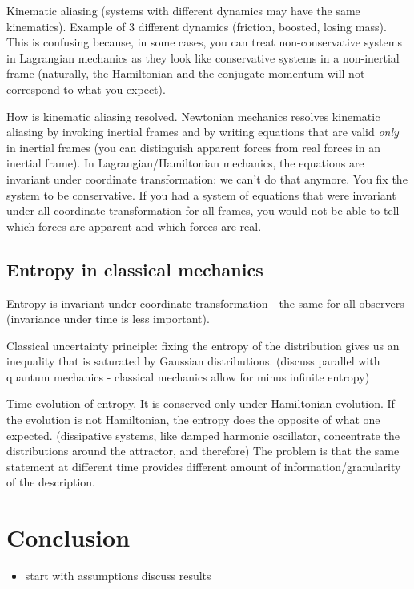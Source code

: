 \documentclass{article}
\begin{document}
Kinematic aliasing (systems with different dynamics may have the same kinematics). Example of 3 different dynamics (friction, boosted, losing mass). This is confusing because, in some cases, you can treat non-conservative systems in Lagrangian mechanics as they look like conservative systems in a non-inertial frame (naturally, the Hamiltonian and the conjugate momentum will not correspond to what you expect).

How is kinematic aliasing resolved. Newtonian mechanics resolves kinematic aliasing by invoking inertial frames and by writing equations that are valid \emph{only} in inertial frames (you can distinguish apparent forces from real forces in an inertial frame).  In Lagrangian/Hamiltonian mechanics, the equations are invariant under coordinate transformation: we can't do that anymore. You fix the system to be conservative. If you had a system of equations that were invariant under all coordinate transformation for all frames, you would not be able to tell which forces are apparent and which forces are real.

\subsection{Entropy in classical mechanics}

Entropy is invariant under coordinate transformation - the same for all observers (invariance under time is less important).

Classical uncertainty principle: fixing the entropy of the distribution gives us an inequality that is saturated by Gaussian distributions. (discuss parallel with quantum mechanics - classical mechanics allow for minus infinite entropy)

Time evolution of entropy. It is conserved only under Hamiltonian evolution. If the evolution is not Hamiltonian, the entropy does the opposite of what one expected. (dissipative systems, like damped harmonic oscillator, concentrate the distributions around the attractor, and therefore) The problem is that the same statement at different time provides different amount of information/granularity of the description.
\fi

\section{Conclusion}
	
\begin{itemize}

	\item start with assumptions discuss results

\end{itemize}




\end{document}
